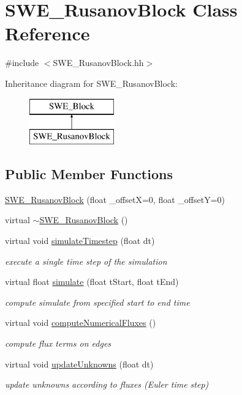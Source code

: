 \hypertarget{classSWE__RusanovBlock}{\section{S\-W\-E\-\_\-\-Rusanov\-Block Class Reference}
\label{classSWE__RusanovBlock}
}


{\ttfamily \#include $<$S\-W\-E\-\_\-\-Rusanov\-Block.\-hh$>$}

Inheritance diagram for S\-W\-E\-\_\-\-Rusanov\-Block\-:\begin{figure}[H]
\begin{center}
\leavevmode
\includegraphics[height=2.000000cm]{classSWE__RusanovBlock}
\end{center}
\end{figure}
\subsection*{Public Member Functions}
\begin{DoxyCompactItemize}
\item 
\hyperlink{classSWE__RusanovBlock_a479a282899300076c44ccabcb42b5b5c}{S\-W\-E\-\_\-\-Rusanov\-Block} (float \-\_\-offset\-X=0, float \-\_\-offset\-Y=0)
\item 
virtual \hyperlink{classSWE__RusanovBlock_aab12f79b94c8ac3cc541ceb2814f72d4}{$\sim$\-S\-W\-E\-\_\-\-Rusanov\-Block} ()
\item 
virtual void \hyperlink{classSWE__RusanovBlock_ada062db4f54700011d50378b0045830a}{simulate\-Timestep} (float dt)
\begin{DoxyCompactList}\small\item\em execute a single time step of the simulation \end{DoxyCompactList}\item 
virtual float \hyperlink{classSWE__RusanovBlock_a645322106b3e5b6f0cca077611ad2159}{simulate} (float t\-Start, float t\-End)
\begin{DoxyCompactList}\small\item\em compute simulate from specified start to end time \end{DoxyCompactList}\item 
virtual void \hyperlink{classSWE__RusanovBlock_a78cdefa510cd2d88ca4e213f75b9b10b}{compute\-Numerical\-Fluxes} ()
\begin{DoxyCompactList}\small\item\em compute flux terms on edges \end{DoxyCompactList}\item 
virtual void \hyperlink{classSWE__RusanovBlock_a2980aa21030ba8fc607001ad817d7454}{update\-Unknowns} (float dt)
\begin{DoxyCompactList}\small\item\em update unknowns according to fluxes (Euler time step) \end{DoxyCompactList}\end{DoxyCompactItemize}
